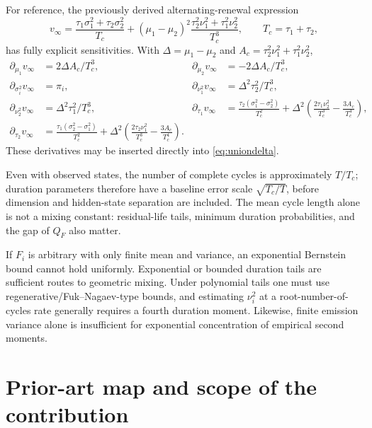 \documentclass[11pt]{article}
\theoremstyle{definition}
\theoremstyle{remark}
\begin{document}
For reference, the previously derived alternating-renewal expression
\begin{equation}
 v_\infty=
 \frac{\tau_1\sigma_1^2+\tau_2\sigma_2^2}{T_c}
 +(\mu_1-\mu_2)^2
 \frac{\tau_2^2\nu_1^2+\tau_1^2\nu_2^2}{T_c^3},
 \qquad T_c=\tau_1+\tau_2,
 \label{eq:vinfhsmm}
\end{equation}
has fully explicit sensitivities.  With $\Delta=\mu_1-\mu_2$ and
$A_c=\tau_2^2\nu_1^2+\tau_1^2\nu_2^2$,
\begin{align*}
 \partial_{\mu_1}v_\infty&=2\Delta A_c/T_c^3,&
 \partial_{\mu_2}v_\infty&=-2\Delta A_c/T_c^3,\\
 \partial_{\sigma_i^2}v_\infty&=\pi_i,&
 \partial_{\nu_1^2}v_\infty&=\Delta^2\tau_2^2/T_c^3,\\
 \partial_{\nu_2^2}v_\infty&=\Delta^2\tau_1^2/T_c^3,&
 \partial_{\tau_1}v_\infty
 &=\frac{\tau_2(\sigma_1^2-\sigma_2^2)}{T_c^2}
 +\Delta^2\left(\frac{2\tau_1\nu_2^2}{T_c^3}
 -\frac{3A_c}{T_c^4}\right),\\
 \partial_{\tau_2}v_\infty
 &=\frac{\tau_1(\sigma_2^2-\sigma_1^2)}{T_c^2}
 +\Delta^2\left(\frac{2\tau_2\nu_1^2}{T_c^3}
 -\frac{3A_c}{T_c^4}\right).
\end{align*}
These derivatives may be inserted directly into
\eqref{eq:uniondelta}.







Even with observed states, the number of complete cycles is approximately
$T/T_c$; duration parameters therefore have a baseline error scale
$\sqrt{T_c/T}$, before dimension and hidden-state separation are included.
The mean cycle length alone is not a mixing constant: residual-life tails,
minimum duration probabilities, and the gap of $Q_F$ also matter.

If $F_i$ is arbitrary with only finite mean and variance, an exponential
Bernstein bound cannot hold uniformly.  Exponential or bounded duration tails
are sufficient routes to geometric mixing.  Under polynomial tails one must
use regenerative/Fuk--Nagaev-type bounds, and estimating $\nu_i^2$ at a
root-number-of-cycles rate generally requires a fourth duration moment.
Likewise, finite emission variance alone is insufficient for exponential
concentration of empirical second moments.

\section{Prior-art map and scope of the contribution}
\end{document}
